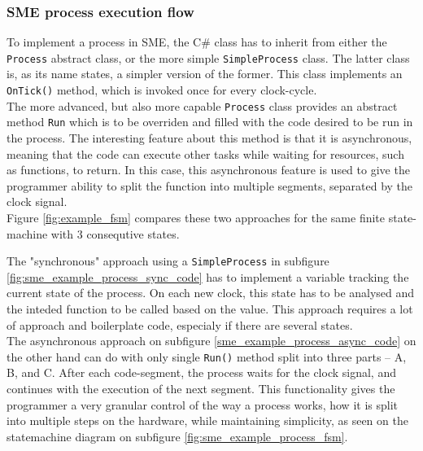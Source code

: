 \subsubsection{SME process execution flow}
To implement a process in SME, the C\# class has to inherit from
either the \texttt{Process} abstract class, or the more simple
\texttt{SimpleProcess} class.
The latter class is, as its name states, a simpler version of the former. This
class implements an \texttt{OnTick()} method, which is invoked once for every
clock-cycle.\\
The more advanced, but also more capable \texttt{Process} class provides
an abstract method \texttt{Run} which is to be overriden and filled
with the code desired to be run in the process. The interesting feature
about this method is that it is asynchronous, meaning that the code can
execute other tasks while waiting for resources, such as functions,
to return. In this case, this asynchronous feature is used to give
the programmer ability to split the function into multiple segments,
separated by the clock signal.\\
Figure \ref{fig:example_fsm} compares these two approaches for the same
finite state-machine with 3 consequtive states.

The "synchronous" approach using a \texttt{SimpleProcess} in subfigure
\ref{fig:sme_example_process_sync_code} has to implement a
variable tracking the current state of the process. On each new clock, this
state has to be analysed and the inteded function to be called based on the
value. This approach requires a lot of approach and boilerplate code, especialy
if there are several states.\\
The asynchronous approach on subfigure
\ref{sme_example_process_async_code} on the other hand can do with only
single \texttt{Run()} method split into three parts -- A, B, and C.
After each code-segment, the process waits for the clock signal, and
continues with the execution of the next segment.  This functionality
gives the programmer a very granular control of the way a process
works, how it is split into multiple steps on the hardware, while
maintaining simplicity, as seen on the statemachine diagram on subfigure
\ref{fig:sme_example_process_fsm}.

